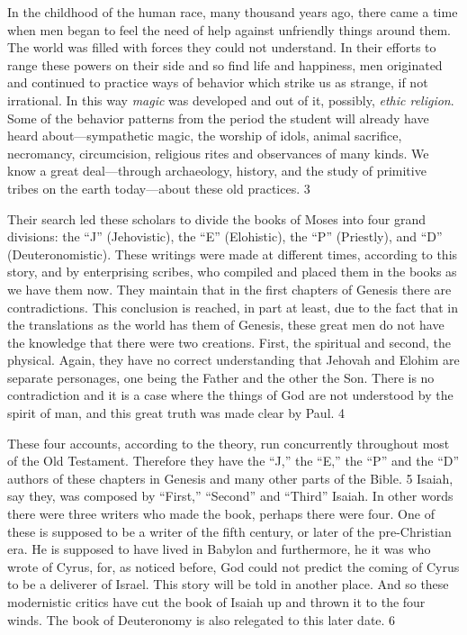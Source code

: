 In the childhood of the human race, many thousand years ago, there came a time when men
began to feel the need of help against unfriendly things around them. The world was filled
with forces they could not understand. In their efforts to range these powers on their side and
so find life and happiness, men originated and continued to practice ways of behavior which
strike us as strange, if not irrational. In this way \textit{magic} was developed and out of it, possibly,
\textit{ethic religion}. Some of the behavior patterns from the period the student will already have
heard about—sympathetic magic, the worship of idols, animal sacrifice, necromancy,
circumcision, religious rites and observances of many kinds. We know a great deal—through
archaeology, history, and the study of primitive tribes on the earth today—about these old
practices. 3

Their search led these scholars to divide the books of Moses into four grand divisions: the ``J''
(Jehovistic), the ``E'' (Elohistic), the ``P'' (Priestly), and ``D'' (Deuteronomistic). These
writings were made at different times, according to this story, and by enterprising scribes,
who compiled and placed them in the books as we have them now. They maintain that in the
first chapters of Genesis there are contradictions. This conclusion is reached, in part at least,
due to the fact that in the translations as the world has them of Genesis, these great men do
not have the knowledge that there were two creations. First, the spiritual and second, the
physical. Again, they have no correct understanding that Jehovah and Elohim are separate
personages, one being the Father and the other the Son. There is no contradiction and it is a
case where the things of God are not understood by the spirit of man, and this great truth was
made clear by Paul. 4

These four accounts, according to the theory, run concurrently throughout most of the Old
Testament. Therefore they have the ``J,'' the ``E,'' the ``P'' and the ``D'' authors of these
chapters in Genesis and many other parts of the Bible. 5 Isaiah, say they, was composed by
``First,'' ``Second'' and ``Third'' Isaiah. In other words there were three writers who made the
book, perhaps there were four. One of these is supposed to be a writer of the fifth century, or
later of the pre-Christian era. He is supposed to have lived in Babylon and furthermore, he it
was who wrote of Cyrus, for, as noticed before, God could not predict the coming of Cyrus to
be a deliverer of Israel. This story will be told in another place. And so these modernistic
critics have cut the book of Isaiah up and thrown it to the four winds. The book of
Deuteronomy is also relegated to this later date. 6


